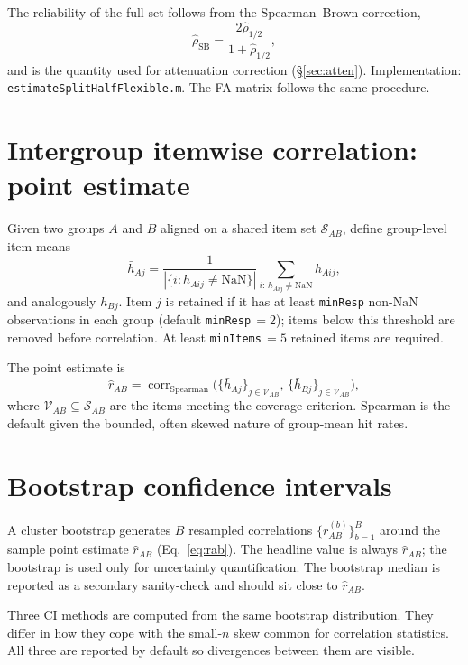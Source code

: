 \documentclass[11pt]{article}
\newcommand{\corr}{\operatorname{corr}}
\newcommand{\NaN}{\text{NaN}}
\begin{document}
The reliability of the full set follows from the Spearman--Brown correction,
\begin{equation}
\hat\rho_{\mathrm{SB}}=\frac{2\hat\rho_{1/2}}{1+\hat\rho_{1/2}},
\label{eq:sb}
\end{equation}
and is the quantity used for attenuation correction (\S\ref{sec:atten}). Implementation: \texttt{estimateSplitHalfFlexible.m}. The FA matrix follows the same procedure.

\section{Intergroup itemwise correlation: point estimate}
Given two groups $A$ and $B$ aligned on a shared item set $\mathcal{S}_{AB}$, define group-level item means
\begin{equation}
\bar h_{Aj}=\frac{1}{|\{i: h_{Aij}\ne\NaN\}|}\sum_{i:\,h_{Aij}\ne\NaN}h_{Aij},
\end{equation}
and analogously $\bar h_{Bj}$. Item $j$ is retained if it has at least \texttt{minResp} non-$\NaN$ observations in each group (default \texttt{minResp}\,$=2$); items below this threshold are removed before correlation. At least \texttt{minItems}\,$=5$ retained items are required.

The point estimate is
\begin{equation}
\hat r_{AB} = \corr_{\mathrm{Spearman}}\!\bigl(\{\bar h_{Aj}\}_{j\in\mathcal{V}_{AB}},\,\{\bar h_{Bj}\}_{j\in\mathcal{V}_{AB}}\bigr),
\label{eq:rab}
\end{equation}
where $\mathcal{V}_{AB}\subseteq\mathcal{S}_{AB}$ are the items meeting the coverage criterion. Spearman is the default given the bounded, often skewed nature of group-mean hit rates.

\section{Bootstrap confidence intervals}
\label{sec:boot}
A cluster bootstrap generates $B$ resampled correlations $\{r^{(b)}_{AB}\}_{b=1}^B$ around the sample point estimate $\hat r_{AB}$ (Eq.~\ref{eq:rab}). The headline value is always $\hat r_{AB}$; the bootstrap is used only for uncertainty quantification. The bootstrap median is reported as a secondary sanity-check and should sit close to $\hat r_{AB}$.

Three CI methods are computed from the same bootstrap distribution. They differ in how they cope with the small-$n$ skew common for correlation statistics. All three are reported by default so divergences between them are visible.
\end{document}
